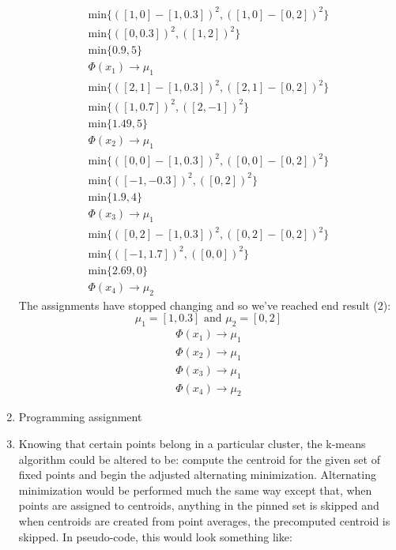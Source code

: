 \documentclass[12pt]{article}
\begin{document}
\begin{enumerate}[label=(\alph*)]
\begin{gather*}
				\text{min} \{ ( [1,0] - [1, 0.3] )^2, ( [1,0] - [0, 2] )^2\} \\
				\text{min} \{ ( [0,0.3] )^2, ( [1, 2] )^2\} \\
				\text{min} \{ 0.9, 5\} \\
				\Phi(x_1) \rightarrow \mu_1
			\end{gather*}
			\begin{gather*}
				\text{min} \{ ( [2,1] - [1, 0.3] )^2, ( [2,1] - [0, 2] )^2\} \\
				\text{min} \{ ( [1,0.7] )^2, ( [2, -1] )^2\} \\
				\text{min} \{ 1.49, 5\} \\
				\Phi(x_2) \rightarrow \mu_1
			\end{gather*}
			\begin{gather*}
				\text{min} \{ ( [0,0] - [1, 0.3] )^2, ( [0,0] - [0, 2] )^2\} \\
				\text{min} \{ ( [-1,-0.3] )^2, ( [0, 2] )^2\} \\
				\text{min} \{ 1.9, 4\} \\
				\Phi(x_3) \rightarrow \mu_1
			\end{gather*}
			\begin{gather*}
				\text{min} \{ ( [0,2] - [1, 0.3] )^2, ( [0,2] - [0, 2] )^2\} \\
				\text{min} \{ ( [-1,1.7] )^2, ( [0, 0] )^2\} \\
				\text{min} \{ 2.69, 0\} \\
				\Phi(x_4) \rightarrow \mu_2
			\end{gather*}
			The assignments have stopped changing and so we've reached end result (2):
			\[
				\mu_1 = [1, 0.3] \text{ and } \mu_2 = [0, 2]
			\]
			\begin{gather*}
				\Phi(x_1) \rightarrow \mu_1 \\
				\Phi(x_2) \rightarrow \mu_1 \\
				\Phi(x_3) \rightarrow \mu_1 \\
				\Phi(x_4) \rightarrow \mu_2
			\end{gather*}


		\item Programming assignment
		\item Knowing that certain points belong in a particular cluster, the k-means
			algorithm could be altered to be: compute the centroid for the given set of
			fixed points and begin the adjusted alternating minimization. Alternating
			minimization would be performed much the same way except that, when
			points are assigned to centroids, anything in the pinned set is skipped and
			when centroids are created from point averages, the precomputed centroid
			is skipped. In pseudo-code, this would look something like:


\end{enumerate}
\end{document}
